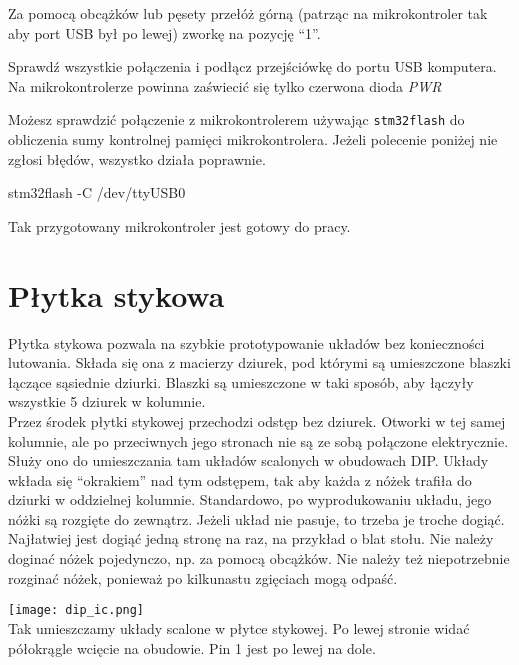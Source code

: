 \documentclass{pdfBooklets}
\begin{document}
Za pomocą obcążków lub pęsety przełóż górną (patrząc na mikrokontroler tak aby port USB był po lewej) zworkę na
pozycję ``1''.

Sprawdź wszystkie połączenia i podłącz przejściówkę do portu USB komputera. Na mikrokontrolerze powinna zaświecić się tylko czerwona dioda
\textit{PWR}

Możesz sprawdzić połączenie z mikrokontrolerem używając \Verb$stm32flash$ do obliczenia sumy kontrolnej pamięci mikrokontrolera.
Jeżeli polecenie poniżej nie zgłosi błędów, wszystko działa poprawnie.

\begin{CodeFrame*}[bash]{}
stm32flash -C /dev/ttyUSB0
\end{CodeFrame*}

Tak przygotowany mikrokontroler jest gotowy do pracy.


\section{Płytka stykowa}
Płytka stykowa pozwala na szybkie prototypowanie układów bez konieczności lutowania. Składa się ona z macierzy dziurek,
pod którymi są umieszczone blaszki łączące sąsiednie dziurki. Blaszki są umieszczone w taki sposób, aby łączyły wszystkie
5 dziurek w kolumnie.
\\

Przez środek płytki stykowej przechodzi odstęp bez dziurek. Otworki w tej samej kolumnie, ale po przeciwnych jego
stronach nie są ze sobą połączone elektrycznie. Służy ono do umieszczania tam układów scalonych w obudowach DIP.
Układy wkłada się ``okrakiem'' nad tym odstępem, tak aby każda z nóżek trafiła do dziurki w oddzielnej kolumnie.
Standardowo, po wyprodukowaniu układu, jego nóżki są rozgięte do zewnątrz. Jeżeli układ nie pasuje, to trzeba je troche dogiąć.
Najłatwiej jest dogiąć jedną stronę na raz, na przykład o blat stołu. Nie należy doginać nóżek pojedynczo, np. za pomocą obcążków.
Nie należy też niepotrzebnie rozginać nóżek, ponieważ po kilkunastu zgięciach mogą odpaść.
\\

\begin{Ramka}{}\begin{center}
  \noindent\texttt{[image: dip\_ic.png]}\\
  Tak umieszczamy układy scalone w płytce stykowej. Po lewej stronie widać półokrągle wcięcie na obudowie. Pin 1 jest po lewej na dole.
\end{center}\end{Ramka}
\end{document}
